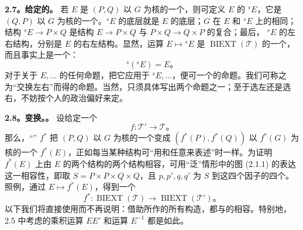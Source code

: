 \textbf{2.7。给定的。} 若 $E$ 是 $(P,Q)$ 以 $G$ 为核的一个，则可定义 $E$ 的 ${}^sE$，它是 $(Q,P)$ 以 $G$ 为核的一个。${}^sE$ 的底层就是 $E$ 的底层；$G$ 在 $E$ 和 ${}^sE$ 上的相同；结构 ${}^sE\to P\times Q$ 是结构 $E\to P\times Q$ 与 $P\times Q\to Q\times P$ 的复合；最后，
${}^sE$ 的左右结构，分别是 $E$ 的右左结构。显然，运算 $E\mapsto{}^sE$ 是 $\operatorname{BIEXT}(\mathcal T)$ 的一个，而且事实上是一个：
\[
{}^s({}^sE)=E。
\]
对于关于 $E,\ldots$ 的任何命题，把它应用于 ${}^sE,\ldots$，便可一个的命题。我们可称之为“交换左右”而得的命题。当然，只须具体写出两个命题之一；至于选左还是选右，不妨按个人的政治偏好来定。

\textbf{2.8。变换。。} 设给定一个
\[
f:\mathcal T'\longrightarrow\mathcal T。
\]
那么，“” $f^*$ 把 $(P,Q)$ 以 $G$ 为核的一个变成 $(f^*(P),f^*(Q))$ 以 $f^*(G)$ 为核的一个 $f^*(E)$，正如每当某种结构可“用和任意来表述”时一样。为证明 $f^*(E)$ 上由 $E$ 的两个结构的两个结构相容，可用“泛”情形中的图 (2.1.1) 的表达这一相容性，即取 $S=P\times P\times Q\times Q$，且 $p,p',q,q'$ 为 $S$ 到这四个因子的四个。照例，通过 $E\mapsto f^*(E)$，得到一个
\[
f^*:\operatorname{BIEXT}(\mathcal T)\longrightarrow\operatorname{BIEXT}(\mathcal T')。
\]
以下我们将直接使用而不再说明：借助所作的所有构造，都与的相容。特别地，2.5 中考虑的乘积运算 $EE'$ 和运算 $E^{-1}$ 都是如此。

